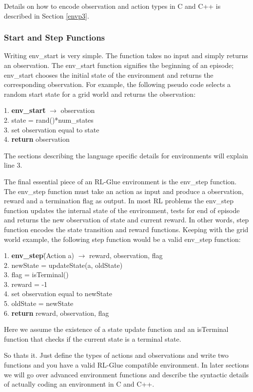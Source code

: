 \documentclass[11pt]{article}
\begin{document}
Details on how to encode observation and action types in C and C++ is described in Section \ref{envp3}.

\subsubsection{Start and Step Functions}
Writing env\_start is very simple. The function takes no input and simply returns an observation. The env\_start function signifies the beginning of an episode; env\_start chooses the initial state of the environment and returns the corresponding observation. For example, the following pseudo code selects a random start state for a grid world and returns the observation:
\begin{tabbing}
1. {\bf env\_start}\= $\rightarrow$ observation\\
2. \>state = rand()*num\_states\\
3. \>set observation equal to state\\
4. {\bf return} observation
\end{tabbing}
The sections describing the language specific details for environments will explain line 3.

The final essential piece of an RL-Glue environment is the env\_step function. The env\_step function must take an action as input and produce a observation, reward and a termination flag as output. In most RL problems the  env\_step function updates the internal state of the environment, tests for end of episode and returns the new observation of state and current reward. In other words, step function encodes the state transition and reward functions. Keeping with the grid world example, the following step function would be a valid env\_step function:
\begin{tabbing}
1. {\bf env\_step}\=(Action a) $\rightarrow$ reward, observation, flag \\
2. \>newState = updateState(a, oldState)\\
3. \> flag = isTerminal()\\
3. \> reward = -1\\
4. \>set observation equal to newState\\
5. \>oldState = newState\\
6. {\bf return} reward, observation, flag
\end{tabbing}
Here we assume the existence of a state update function and an isTerminal function that checks if the current state is a terminal state.

So thats it. Just define the types of actions and observations and write two functions and you have a valid RL-Glue compatible environment. In later sections we will go over advanced environment functions and describe the syntactic details of actually coding an environment in C and C++. 
\end{document}

